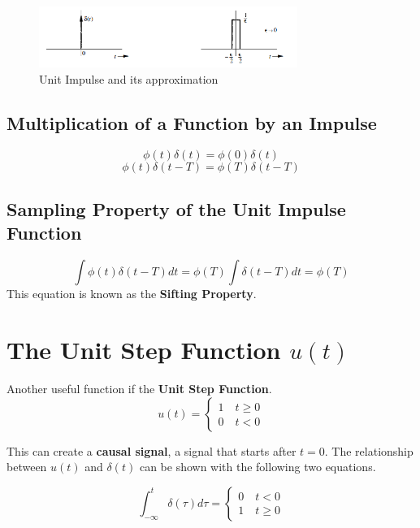 \documentclass{article}
\begin{document}
    \begin{figure}[h]
        \centering
        \includegraphics[width=0.75\textwidth]{delta}
        \caption{Unit Impulse and its approximation}
    \end{figure}

    \subsection{Multiplication of a Function by an Impulse}
    \begin{equation}
        \phi (t) \delta(t) = \phi (0) \delta(t)
    \end{equation}
    \begin{equation}
        \phi (t) \delta(t-T) = \phi (T) \delta(t-T)
    \end{equation}

    \subsection{Sampling Property of the Unit Impulse Function}
    \begin{equation}
        \int \phi(t) \delta (t-T)dt = \phi (T) \int \delta (t-T)dt = \phi (T)
    \end{equation}
    This equation is known as the \textbf{Sifting Property}.

    \section{The Unit Step Function $u(t)$}
    Another useful function if the \textbf{Unit Step Function}.
    \begin{equation}
        u(t) = 
        \begin{cases}
            1 \quad t \geq 0 \\
            0 \quad t < 0
        \end{cases}
    \end{equation}

    This can create a \textbf{causal signal}, a signal that starts after $t = 0$. The relationship between $u(t)$ and $\delta(t)$ can be shown with the 
    following two equations.

    \begin{equation}
        \int_{-\infty}^{t} \delta (\tau) d\tau = 
        \begin{cases}
            0 \quad t < 0 \\
            1 \quad t \geq 0
        \end{cases}
    \end{equation}
\end{document}
